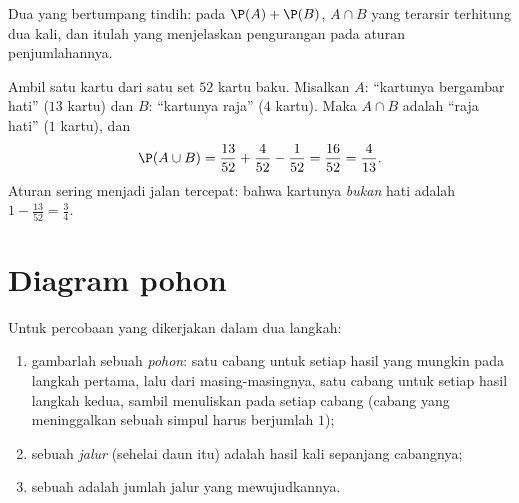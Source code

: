 \begin{omfigure}

{\small Dua  yang bertumpang tindih: pada $\P(A) + \P(B)$, 
$A \cap B$ yang terarsir terhitung dua kali, dan itulah yang menjelaskan
pengurangan pada aturan penjumlahannya.}
\end{omfigure}

\begin{example}\label{ex:g10:proba:cards}
Ambil satu kartu dari satu set $52$ kartu baku. Misalkan $A$: ``kartunya
bergambar hati'' ($13$ kartu) dan $B$: ``kartunya raja'' ($4$ kartu). Maka
$A \cap B$ adalah ``raja hati'' ($1$ kartu), dan
\[
\P(A \cup B) = \frac{13}{52} + \frac{4}{52} - \frac{1}{52} = \frac{16}{52}
= \frac{4}{13}.
\]
Aturan  sering menjadi jalan tercepat:  bahwa kartunya
\emph{bukan} hati adalah $1 - \frac{13}{52} = \frac34$.
\end{example}

\section{Diagram pohon}

\begin{method}\label{met:g10:proba:tree}
Untuk percobaan yang dikerjakan dalam dua langkah:
\begin{enumerate}
  \item gambarlah sebuah \emph{pohon}: satu cabang untuk
        setiap hasil yang mungkin pada langkah pertama, lalu dari
        masing-masingnya, satu cabang untuk setiap hasil langkah kedua, sambil
        menuliskan  pada setiap cabang (cabang yang meninggalkan sebuah
        simpul harus berjumlah $1$);
  \item {} sebuah \emph{jalur} (sehelai daun  itu) adalah
        hasil kali  sepanjang cabangnya;
  \item {} sebuah  adalah jumlah 
        jalur yang mewujudkannya.
\end{enumerate}
\end{method}


